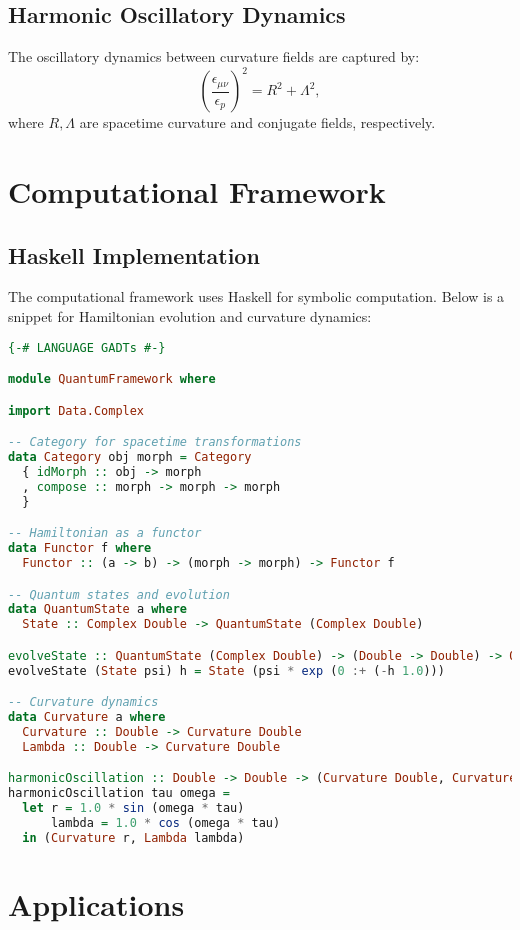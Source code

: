 \documentclass[a4paper,11pt]{article}
\begin{document}
\subsection{Harmonic Oscillatory Dynamics}
The oscillatory dynamics between curvature fields are captured by:
\[
\left(\frac{\epsilon_{\mu\nu}}{\epsilon_p}\right)^2 = R^2 + \Lambda^2,
\]
where \(R, \Lambda\) are spacetime curvature and conjugate fields, respectively.

\section{Computational Framework}
\subsection{Haskell Implementation}
The computational framework uses Haskell for symbolic computation. Below is a snippet for Hamiltonian evolution and curvature dynamics:
\begin{lstlisting}[language=Haskell, caption=Unified Framework in Haskell]
{-# LANGUAGE GADTs #-}

module QuantumFramework where

import Data.Complex

-- Category for spacetime transformations
data Category obj morph = Category
  { idMorph :: obj -> morph
  , compose :: morph -> morph -> morph
  }

-- Hamiltonian as a functor
data Functor f where
  Functor :: (a -> b) -> (morph -> morph) -> Functor f

-- Quantum states and evolution
data QuantumState a where
  State :: Complex Double -> QuantumState (Complex Double)

evolveState :: QuantumState (Complex Double) -> (Double -> Double) -> QuantumState (Complex Double)
evolveState (State psi) h = State (psi * exp (0 :+ (-h 1.0)))

-- Curvature dynamics
data Curvature a where
  Curvature :: Double -> Curvature Double
  Lambda :: Double -> Curvature Double

harmonicOscillation :: Double -> Double -> (Curvature Double, Curvature Double)
harmonicOscillation tau omega =
  let r = 1.0 * sin (omega * tau)
      lambda = 1.0 * cos (omega * tau)
  in (Curvature r, Lambda lambda)
\end{lstlisting}

\section{Applications}
\end{document}
